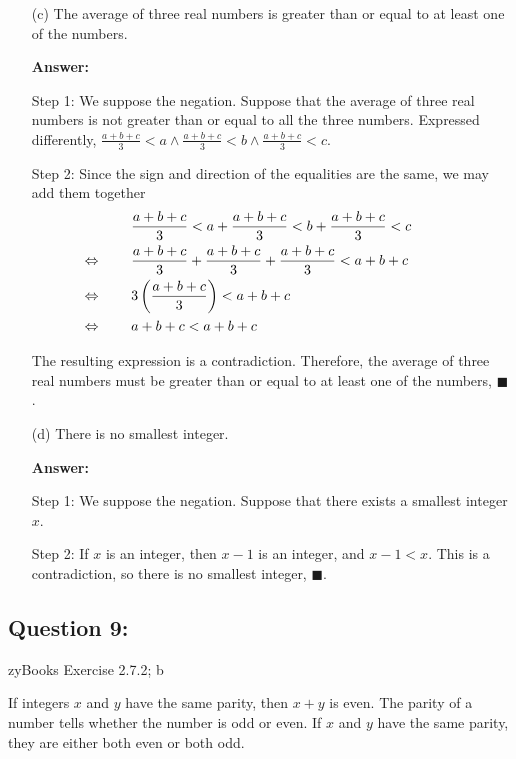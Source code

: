 \documentclass[14pt]{extreport}
\newcommand{\eq}[0]{\llap{\( \Leftrightarrow \) \qquad}}
\newcommand{\answer}[0]{\medskip \textbf{Answer:} \medskip}
\begin{document}
\begin{enumerate}

    \item[(c)] The average of three real numbers is greater than or equal to at least one of the numbers.
    
        \answer

        Step 1: We suppose the negation. Suppose that the average of three real numbers is not greater than or equal to all the three numbers. Expressed differently, \( \frac{a + b + c}{3} < a \land \frac{a + b + c}{3} < b \land \frac{a + b + c}{3} < c \).

        \medskip

        Step 2: Since the sign and direction of the equalities are the same, we may add them together
        \begin{align*}
            & \frac{a + b + c}{3} < a + \frac{a + b + c}{3} < b + \frac{a + b + c}{3} < c \\
            &\eq \frac{a + b + c}{3} + \frac{a + b + c}{3} + \frac{a + b + c}{3} < a + b + c \\
            &\eq 3 \left( \frac{a + b + c}{3} \right) < a + b + c \\
            &\eq a + b + c < a + b + c
        \end{align*}

        The resulting expression is a contradiction. Therefore, the average of three real numbers must be greater than or equal to at least one of the numbers, \( \blacksquare \).

    \item[(d)] There is no smallest integer.
    
    \answer

    Step 1: We suppose the negation. Suppose that there exists a smallest integer \( x \).

    \medskip 

    Step 2: If \( x \) is an integer, then \( x - 1 \) is an integer, and \( x - 1 < x \). This is a contradiction, so there is no smallest integer, \( \blacksquare \).

\end{enumerate}
\newpage

\subsection*{Question 9:}

zyBooks Exercise 2.7.2; b


If integers \( x \) and \( y \) have the same parity, then \( x + y \) is even. The parity of a number tells whether the number is odd or even. If \( x \) and \( y \) have the same parity, they are either both even or both odd.
\end{document}
